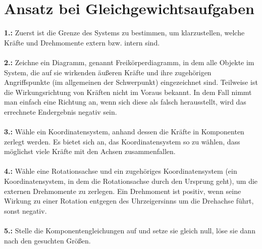 \documentclass[11pt]{article}
\begin{document}
\section{Ansatz bei Gleichgewichtsaufgaben}
\textbf{1.:} Zuerst ist die Grenze des Systems zu bestimmen, um klarzustellen, welche Kräfte und Drehmomente extern bzw. intern sind. \\\\
\textbf{2.:} Zeichne ein Diagramm, genannt Freikörperdiagramm, in dem alle Objekte im System, die auf sie wirkenden äußeren Kräfte und ihre zugehörigen Angriffspunkte (im allgemeinen der Schwerpunkt) eingezeichnet sind. Teilweise ist die Wirkungsrichtung von Kräften nicht im Voraus bekannt. In dem Fall nimmt man einfach eine Richtung an, wenn sich diese als falsch herausstellt, wird das errechnete Endergebnis negativ sein. \\\\
\textbf{3.:} Wähle ein Koordinatensystem, anhand dessen die Kräfte in Komponenten zerlegt werden. Es bietet sich an, das Koordinatensystem so zu wählen, dass möglichst viele Kräfte mit den Achsen zusammenfallen. \\\\
\textbf{4.:} Wähle eine Rotationsachse und ein zugehöriges Koordinatensystem (ein Koordinatensystem, in dem die Rotationsachse durch den Ursprung geht), um die externen Drehmomente zu zerlegen. Ein Drehmoment ist positiv, wenn seine Wirkung zu einer Rotation entgegen des Uhrzeigersinns um die Drehachse führt, sonst negativ.  \\\\
\textbf{5.:} Stelle die Komponentengleichungen auf und setze sie gleich null, löse sie dann nach den gesuchten Größen. 

\pagebreak
\end{document}

